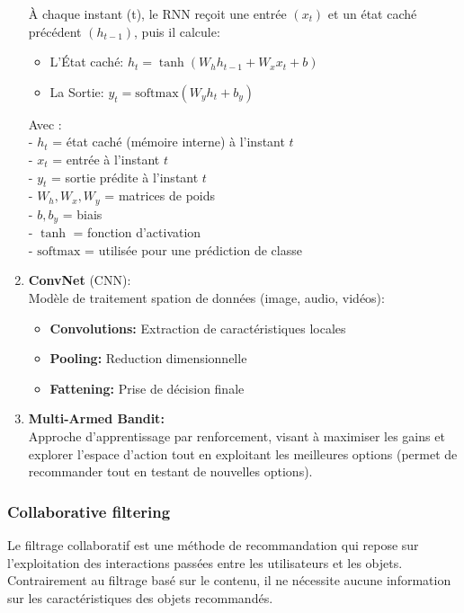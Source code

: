\documentclass{article}
\begin{document}
\begin{enumerate}
        À chaque instant (t), le RNN reçoit une entrée \((x_t)\) et un état caché précédent \((h_{t-1})\), puis il calcule:
        \begin{itemize}
            \item L'État caché: \(h_t = \tanh(W_h h_{t-1} + W_x x_t + b)\)
            \item  La Sortie: \(y_t = \text{softmax}(W_y h_t + b_y)\)
        \end{itemize}
        Avec :\\
        - \( h_t \) = état caché (mémoire interne) à l’instant \( t \)\\
        - \( x_t \) = entrée à l’instant \( t \)\\
        - \( y_t \) = sortie prédite à l’instant \( t \)\\
        - \( W_h, W_x, W_y \) = matrices de poids\\
        - \( b, b_y \) = biais\\
        - \( \tanh \) = fonction d’activation\\
        - \( \text{softmax} \) = utilisée pour une prédiction de classe\\

        \item \textbf{ConvNet} (CNN):\\
        Modèle de traitement spation de données (image, audio, vidéos):
        \begin{itemize}
            \item \textbf{Convolutions:} Extraction de caractéristiques locales
            \item \textbf{Pooling:} Reduction dimensionnelle
            \item \textbf{Fattening:} Prise de décision finale
        \end{itemize}

        \item \textbf{Multi-Armed Bandit: }\\
        Approche d'apprentissage par renforcement, visant à maximiser les gains et explorer l'espace d'action tout en exploitant les meilleures options (permet de recommander tout en testant de nouvelles options).


    \end{enumerate}





    \subsubsection{Collaborative filtering}
    Le filtrage collaboratif est une méthode de recommandation qui repose sur l’exploitation des interactions passées entre les utilisateurs
    et les objets.
    Contrairement au filtrage basé sur le contenu, il ne nécessite aucune information sur les caractéristiques des objets recommandés.
\end{document}
